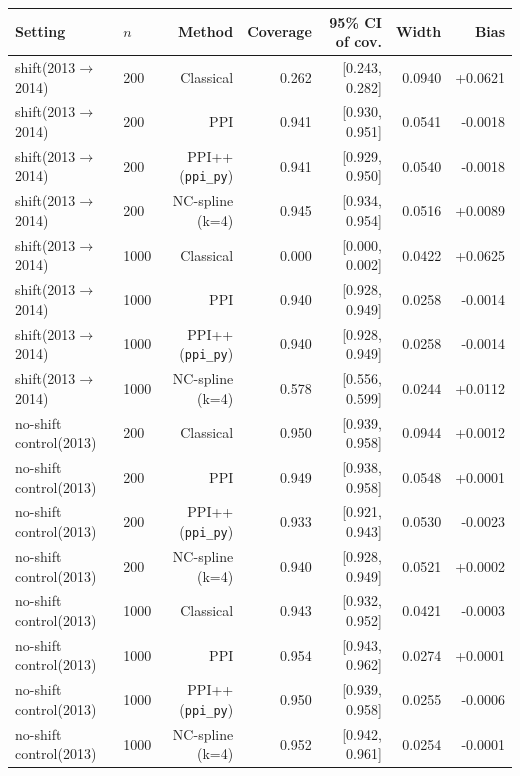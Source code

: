 \begin{tabular}{llrrrrr}
\toprule
Setting & $n$ & Method & Coverage & 95\% CI of cov. & Width & Bias \\
\midrule
shift(2013$\to$2014) & 200 & Classical & 0.262 & [0.243, 0.282] & 0.0940 & +0.0621 \\
shift(2013$\to$2014) & 200 & PPI & 0.941 & [0.930, 0.951] & 0.0541 & -0.0018 \\
shift(2013$\to$2014) & 200 & PPI++ (\texttt{ppi\_py}) & 0.941 & [0.929, 0.950] & 0.0540 & -0.0018 \\
shift(2013$\to$2014) & 200 & NC-spline (k=4) & 0.945 & [0.934, 0.954] & 0.0516 & +0.0089 \\
\midrule
shift(2013$\to$2014) & 1000 & Classical & 0.000 & [0.000, 0.002] & 0.0422 & +0.0625 \\
shift(2013$\to$2014) & 1000 & PPI & 0.940 & [0.928, 0.949] & 0.0258 & -0.0014 \\
shift(2013$\to$2014) & 1000 & PPI++ (\texttt{ppi\_py}) & 0.940 & [0.928, 0.949] & 0.0258 & -0.0014 \\
shift(2013$\to$2014) & 1000 & NC-spline (k=4) & 0.578 & [0.556, 0.599] & 0.0244 & +0.0112 \\
\midrule
no-shift control(2013) & 200 & Classical & 0.950 & [0.939, 0.958] & 0.0944 & +0.0012 \\
no-shift control(2013) & 200 & PPI & 0.949 & [0.938, 0.958] & 0.0548 & +0.0001 \\
no-shift control(2013) & 200 & PPI++ (\texttt{ppi\_py}) & 0.933 & [0.921, 0.943] & 0.0530 & -0.0023 \\
no-shift control(2013) & 200 & NC-spline (k=4) & 0.940 & [0.928, 0.949] & 0.0521 & +0.0002 \\
\midrule
no-shift control(2013) & 1000 & Classical & 0.943 & [0.932, 0.952] & 0.0421 & -0.0003 \\
no-shift control(2013) & 1000 & PPI & 0.954 & [0.943, 0.962] & 0.0274 & +0.0001 \\
no-shift control(2013) & 1000 & PPI++ (\texttt{ppi\_py}) & 0.950 & [0.939, 0.958] & 0.0255 & -0.0006 \\
no-shift control(2013) & 1000 & NC-spline (k=4) & 0.952 & [0.942, 0.961] & 0.0254 & -0.0001 \\
\bottomrule
\end{tabular}